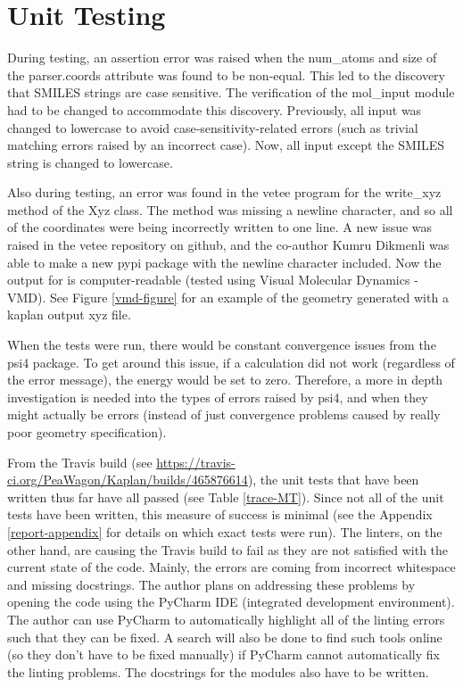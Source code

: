 \documentclass[12pt, titlepage]{article}
\begin{document}
\section{Unit Testing}

During testing, an assertion error was raised when the num\_atoms and size of 
the parser.coords attribute was found to be non-equal. This led to the 
discovery that SMILES strings are case sensitive. The verification of the 
mol\_input module had to be changed to accommodate this discovery. Previously, 
all input was changed to lowercase to avoid case-sensitivity-related errors 
(such as trivial matching errors raised by an incorrect case). Now, all input 
except the SMILES string is changed to lowercase.

Also during testing, an error was found in the vetee program for the write\_xyz 
method of the Xyz class. The method was missing a newline character, and so all 
of the coordinates were being incorrectly written to one line. A new issue was 
raised in the vetee repository on github, and the co-author Kumru Dikmenli was 
able to make a new pypi package with the newline character included. Now the 
output for \progname{} is computer-readable (tested using Visual Molecular 
Dynamics - VMD). See Figure \ref{vmd-figure} for an example of the geometry 
generated with a kaplan output xyz file.

When the tests were run, there would be constant convergence issues from the 
psi4 package. To get around this issue, if a calculation did not work 
(regardless of the error message), the energy would be set to zero. Therefore, 
a more in depth investigation is needed into the types of errors raised by 
psi4, and when they might actually be errors (instead of just convergence 
problems caused by really poor geometry specification).

From the Travis build (see 
\url{https://travis-ci.org/PeaWagon/Kaplan/builds/465876614}), the unit tests 
that have been written thus far have all passed (see Table \ref{trace-MT}). 
Since not all of the unit tests have been written, this measure of success is 
minimal (see the Appendix \ref{report-appendix} for details on which exact 
tests were run). The linters, on the other hand, are causing the Travis build 
to fail as they are not satisfied with the current state of the code. Mainly, 
the errors are coming from incorrect whitespace and missing docstrings. The 
author plans on addressing these problems by opening the code using the PyCharm 
IDE (integrated development environment). The author can use PyCharm to 
automatically highlight all of the linting errors such that they can be fixed. 
A search will also be done to find such tools online (so they don't have to be 
fixed manually) if PyCharm cannot automatically fix the linting problems. The 
docstrings for the modules also have to be written.
\end{document}
